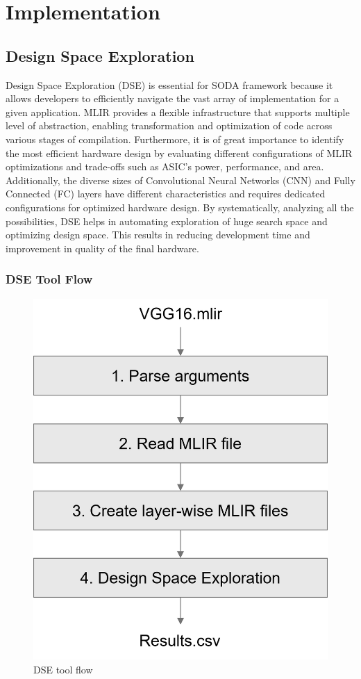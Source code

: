 \fancyhf{}
\fancyfoot[CO, CE]{ \thepage}

\chapter{Implementation}
\label{chapter3}

\section{Design Space Exploration}

Design Space Exploration (DSE) is essential for SODA framework because it allows developers to efficiently navigate the vast array of implementation for a given application. MLIR provides a flexible infrastructure that supports multiple level of abstraction, enabling transformation and optimization of code across various stages of compilation. Furthermore, it is of great importance to identify the most efficient hardware design by evaluating different configurations of MLIR optimizations and trade-offs such as ASIC's power, performance, and area. Additionally, the diverse sizes of Convolutional Neural Networks (CNN) and Fully Connected (FC) layers have different characteristics and requires dedicated configurations for optimized hardware design. By systematically, analyzing all the possibilities, DSE helps in automating exploration of huge search space and optimizing design space. This results in reducing development time and improvement in quality of the final hardware.

\subsection{DSE Tool Flow}

\begin{figure}
    \centering
    \includegraphics[width=0.4\linewidth]{figure//chapter3_implementation/Figure 1 - DSE tool flow.png}
    \caption{DSE tool flow}
    \label{fig:3.1}
\end{figure}

